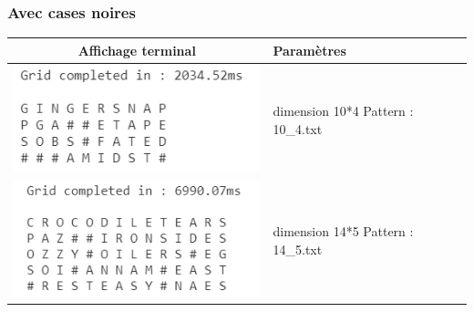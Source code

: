 \documentclass [ 11 pt ] {article}
\begin{document}
        \subsubsection{Avec cases noires}
        \begin{center}
    \begin{tabular}{ | c |  m{5cm} | m{5cm} | }
    \hline
    Affichage terminal & Paramètres \\ 
    \hline
      \includegraphics[]{10_4 black.png}
    & dimension 10*4 \newline Pattern : 10\_4.txt \\
    \hline
    \hline
      \includegraphics[]{14_5 black.png}
    & dimension 14*5 \newline Pattern : 14\_5.txt \\
    \hline
      
    \end{tabular}
    \end{center}
\end{document}
